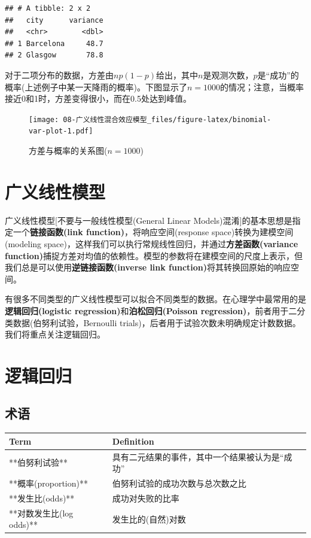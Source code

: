 \documentclass[
]{book}
\begin{document}
\begin{verbatim}
## # A tibble: 2 x 2
##   city      variance
##   <chr>        <dbl>
## 1 Barcelona     48.7
## 2 Glasgow       78.8
\end{verbatim}

对于二项分布的数据，方差由\(np(1-p)\)给出，其中\(n\)是观测次数，\(p\)是``成功''的概率(上述例子中某一天降雨的概率)。下图显示了\(n=1000\)的情况；注意，当概率接近0和1时，方差变得很小，而在0.5处达到峰值。

\begin{figure}
\centering
\texttt{[image: 08-广义线性混合效应模型\_files/figure-latex/binomial-var-plot-1.pdf]}
\caption{\label{fig:binomial-var-plot}方差与概率的关系图(\(n=1000\))}
\end{figure}

\hypertarget{ux5e7fux4e49ux7ebfux6027ux6a21ux578b}{%
\section{广义线性模型}\label{ux5e7fux4e49ux7ebfux6027ux6a21ux578b}}

广义线性模型{[}不要与一般线性模型(General Linear Models)混淆{]}的基本思想是指定一个\textbf{链接函数(link function)}，将响应空间(response space)转换为建模空间(modeling space)，这样我们可以执行常规线性回归，并通过\textbf{方差函数(variance function)}捕捉方差对均值的依赖性。模型的参数将在建模空间的尺度上表示，但我们总是可以使用\textbf{逆链接函数(inverse link function)}将其转换回原始的响应空间。

有很多不同类型的广义线性模型可以拟合不同类型的数据。在心理学中最常用的是\textbf{逻辑回归(logistic regression)}和\textbf{泊松回归(Poisson regression)}，前者用于二分类数据(伯努利试验，Bernoulli trials)，后者用于试验次数未明确规定计数数据。我们将重点关注逻辑回归。

\hypertarget{ux903bux8f91ux56deux5f52}{%
\section{逻辑回归}\label{ux903bux8f91ux56deux5f52}}

\hypertarget{ux672fux8bed}{%
\subsection{术语}\label{ux672fux8bed}}

\begin{tabular}{l|l}
\hline
Term & Definition\\
\hline
**伯努利试验** & 具有二元结果的事件，其中一个结果被认为是“成功”\\
\hline
**概率(proportion)** & 伯努利试验的成功次数与总次数之比\\
\hline
**发生比(odds)** & 成功对失败的比率\\
\hline
**对数发生比(log odds)** & 发生比的(自然)对数\\
\hline
\end{tabular}
\end{document}
